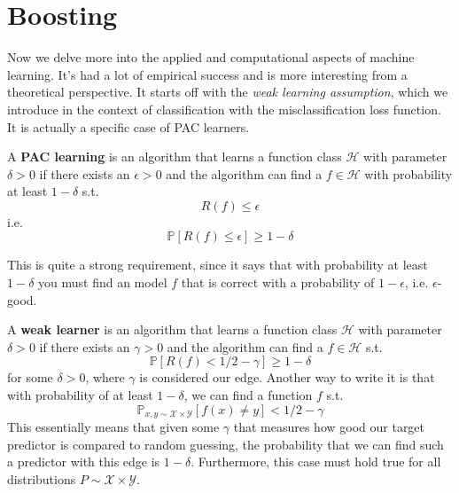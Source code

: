 \section{Boosting} 

  Now we delve more into the applied and computational aspects of machine learning. It's had a lot of empirical success and is more interesting from a theoretical perspective. It starts off with the \textit{weak learning assumption}, which we introduce in the context of classification with the misclassification loss function. It is actually a specific case of PAC learners. 

  \begin{definition}
    \label{def:probability-approximately-correct-learner}
    A \textbf{PAC learning} is an algorithm that learns a function class $\mathcal{H}$ with parameter $\delta > 0$ if there exists an $\epsilon > 0$ and the algorithm can find a $f \in \mathcal{H}$ with probability at least $1 - \delta$ s.t.
    \begin{equation}
      R(f) \leq \epsilon 
    \end{equation}
    i.e. 
    \begin{equation}
      \mathbb{P}[ R(f) \leq \epsilon] \geq 1 - \delta
    \end{equation}
  \end{definition}

  This is quite a strong requirement, since it says that with probability at least $1 - \delta$ you must find an model $f$ that is correct with a probability of $1 - \epsilon$, i.e. $\epsilon$-good.

  \begin{definition}
    \label{def:weak-learner}
    A \textbf{weak learner} is an algorithm that learns a function class $\mathcal{H}$ with parameter $\delta > 0$ if there exists an $\gamma > 0$ and the algorithm can find a $f \in \mathcal{H}$ s.t. 
    \begin{equation}
      \mathbb{P}[ R(f) < 1/2 - \gamma] \geq 1 - \delta
    \end{equation}
    for some $\delta > 0$, where $\gamma$ is considered our edge. Another way to write it is that with probability of at least $1 - \delta$, we can find a function $f$ s.t. 
    \begin{equation}
      \mathbb{P}_{x, y \sim \mathcal{X} \times \mathcal{Y}} [f(x) \neq y] < 1/2 - \gamma 
    \end{equation}
    This essentially means that given some $\gamma$ that measures how good our target predictor is compared to random guessing, the probability that we can find such a predictor with this edge is $1 - \delta$. Furthermore, this case must hold true for all distributions $P \sim \mathcal{X} \times \mathcal{Y}$. 
  \end{definition}

